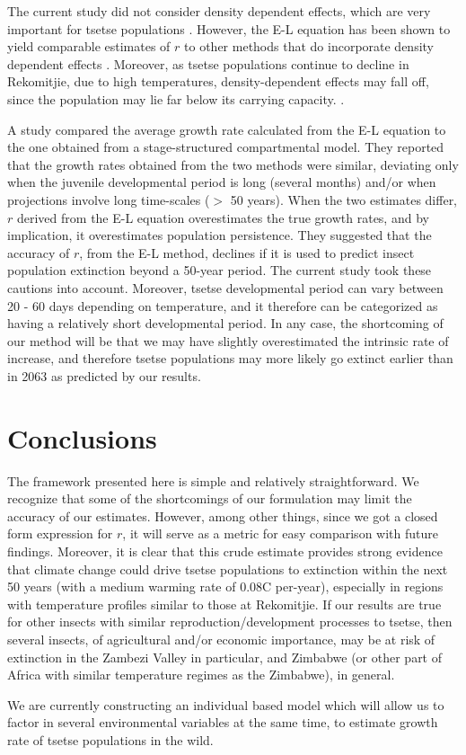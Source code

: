 \documentclass[12pt,a4paper]{article}
\begin{document}
The current study did not consider density dependent effects, which are very important for tsetse populations \cite{Rogers1975}. However, the E-L equation has been shown to yield comparable estimates of $r$ to other methods that do incorporate density dependent effects \cite{Cortes2016}. Moreover, as tsetse populations continue to decline in Rekomitjie, due to high temperatures, density-dependent effects may fall off, since the population may lie far below its carrying capacity. . 


A study \cite{Amarasekare2013} compared the average growth rate calculated from the E-L equation to the one obtained from a stage-structured compartmental model. They reported that the growth rates obtained from the two methods were similar, deviating only when the juvenile developmental period is long (several months) and/or when projections involve long time-scales ($>$ 50 years).  When the two estimates differ, $r$ derived from the E-L equation overestimates the true growth rates, and by implication, it overestimates population persistence. They suggested that the accuracy of $r$, from the E-L method, declines if it is used to predict insect population extinction beyond a 50-year period.  The current study took these cautions into account. Moreover, tsetse developmental period can vary between 20 - 60 days depending on temperature, and it therefore can be categorized as having a relatively short developmental period. In any case, the shortcoming of our method will be that we may have slightly overestimated the intrinsic rate of increase, and therefore tsetse populations may more likely go extinct earlier than in 2063 as predicted by our results.
\section*{Conclusions}
The framework presented here is simple and relatively straightforward. We recognize that some of the shortcomings of our formulation may limit the accuracy of our estimates.  However, among other things, since we got a closed form expression for $r$, it will serve as a metric for easy comparison with future findings. Moreover, it is clear that this crude estimate provides strong evidence that climate change could drive tsetse populations to extinction within the next 50 years (with a medium warming rate of 0.08\textdegree C per-year), especially in regions with temperature profiles similar to those at Rekomitjie. If our results are true for other insects with similar reproduction/development processes to tsetse, then several insects, of agricultural and/or economic importance, may be at risk of extinction in the Zambezi Valley in particular, and Zimbabwe (or other part of Africa with similar temperature regimes as the Zimbabwe), in general. 

We are currently constructing an individual based model which will allow us to factor in several environmental variables at the same time, to estimate growth rate of tsetse populations in the wild. 



\nocite{*}

\end{document}
